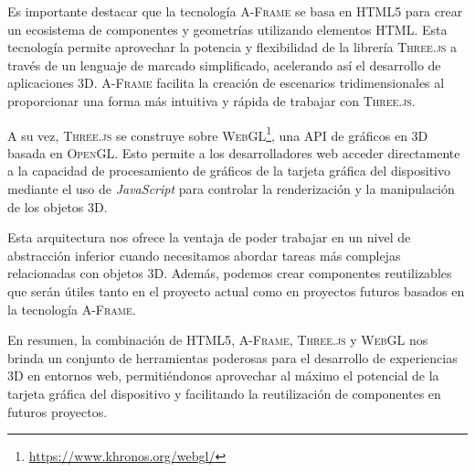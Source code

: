 \documentclass[a4paper, 11pt]{book}
\begin{document}
Es importante destacar que la tecnología \textsc{A-Frame} se basa en \textsc{HTML5} para crear un ecosistema de componentes y geometrías utilizando elementos \textsc{HTML}. Esta tecnología permite aprovechar la potencia y flexibilidad de la librería \textsc{Three.js} a través de un lenguaje de marcado simplificado, acelerando así el desarrollo de aplicaciones \textsc{3D}. \textsc{A-Frame} facilita la creación de escenarios tridimensionales al proporcionar una forma más intuitiva y rápida de trabajar con \textsc{Three.js}.

A su vez, \textsc{Three.js} se construye sobre \textsc{\gls{WebGL}}\footnote{\url{https://www.khronos.org/webgl/}}, una \Gls{API} de gráficos en \textsc{3D} basada en \textsc{OpenGL}. Esto permite a los desarrolladores web acceder directamente a la capacidad de procesamiento de gráficos de la tarjeta gráfica del dispositivo mediante el uso de \emph{JavaScript} para controlar la \gls{renderización} y la manipulación de los objetos \textsc{3D}.

Esta arquitectura nos ofrece la ventaja de poder trabajar en un nivel de abstracción inferior cuando necesitamos abordar tareas más complejas relacionadas con objetos \textsc{3D}. Además, podemos crear componentes reutilizables que serán útiles tanto en el proyecto actual como en proyectos futuros basados en la tecnología \textsc{A-Frame}.

En resumen, la combinación de \textsc{HTML5}, \textsc{A-Frame}, \textsc{Three.js} y \textsc{WebGL} nos brinda un conjunto de herramientas poderosas para el desarrollo de experiencias \textsc{3D} en entornos web, permitiéndonos aprovechar al máximo el potencial de la tarjeta gráfica del dispositivo y facilitando la reutilización de componentes en futuros proyectos.
\end{document}
